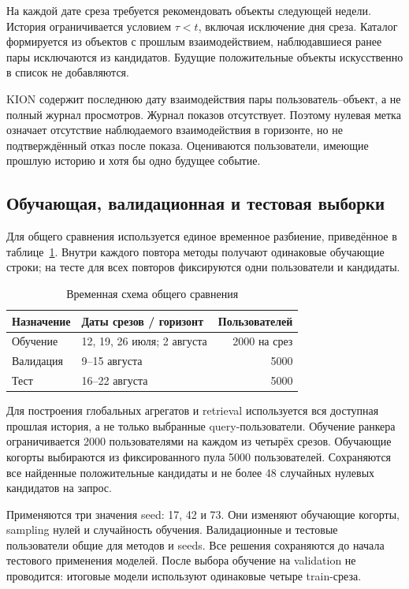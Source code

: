 \documentclass[12pt,a4paper]{article}
\begin{document}
На каждой дате среза требуется рекомендовать объекты следующей недели.
История ограничивается условием $\tau<t$, включая исключение дня среза.
Каталог формируется из объектов с прошлым взаимодействием, наблюдавшиеся
ранее пары исключаются из кандидатов. Будущие положительные объекты
искусственно в список не добавляются.

KION содержит последнюю дату взаимодействия пары пользователь–объект,
а не полный журнал просмотров. Журнал показов отсутствует. Поэтому
нулевая метка означает отсутствие наблюдаемого взаимодействия в горизонте,
но не подтверждённый отказ после показа. Оцениваются пользователи,
имеющие прошлую историю и хотя бы одно будущее событие.

\subsection{Обучающая, валидационная и тестовая выборки}
Для общего сравнения используется единое временное разбиение,
приведённое в таблице~\ref{tab:split}. Внутри каждого повтора методы
получают одинаковые обучающие строки; на тесте для всех повторов
фиксируются одни пользователи и кандидаты.
\begin{table}[H]
\centering
\small
\caption{Временная схема общего сравнения}\label{tab:split}
\begin{tabular}{llr}\toprule
Назначение & Даты срезов / горизонт & Пользователей \\ \midrule
Обучение & 12, 19, 26 июля; 2 августа & 2000 на срез \\
Валидация & 9–15 августа & 5000 \\
Тест & 16–22 августа & 5000 \\
\bottomrule
\end{tabular}
\end{table}
Для построения глобальных агрегатов и retrieval используется вся
доступная прошлая история, а не только выбранные query-пользователи.
Обучение ранкера ограничивается 2000 пользователями на каждом из четырёх
срезов. Обучающие когорты выбираются из фиксированного пула 5000 пользователей.
Сохраняются все найденные положительные кандидаты и не более 48
случайных нулевых кандидатов на запрос.

Применяются три значения seed: 17, 42 и 73. Они изменяют обучающие
когорты, sampling нулей и случайность обучения. Валидационные и тестовые
пользователи общие для методов и seeds. Все решения сохраняются до
начала тестового применения моделей. После выбора обучение на validation
не проводится: итоговые модели используют одинаковые четыре train-среза.
\end{document}
